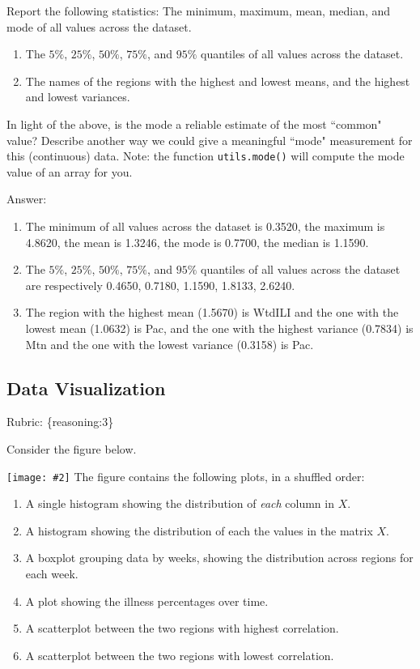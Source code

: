 \documentclass{article}
\def\blu#1{{\color{blu}#1}}
\def\gre#1{{\color{gre}#1}}
\newcommand{\fig}[2]{\texttt{[image: \#2]}}
\def\enum#1{\begin{enumerate}#1\end{enumerate}}
\def\rubric#1{\gre{Rubric: \{#1\}}}{}
\begin{document}
\blu{Report the following statistics}:
The minimum, maximum, mean, median, and mode of all values across the dataset.
\enum{
\item The $5\%$, $25\%$, $50\%$, $75\%$, and $95\%$ quantiles of all values across the dataset.
\item The names of the regions with the highest and lowest means, and the highest and lowest variances.
}
In light of the above, \blu{is the mode a reliable estimate of the most ``common" value? Describe another way we could give a meaningful ``mode" measurement for this (continuous) data.} Note: the function \texttt{utils.mode()} will compute the mode value of an array for you.

\textcolor{gre}{
Answer:
\enum{
\item The minimum of all values across the dataset is 0.3520, the maximum is 4.8620, the mean is 1.3246, the mode is 0.7700, the median is 1.1590.
\item The $5\%$, $25\%$, $50\%$, $75\%$, and $95\%$ quantiles of all values across the dataset are respectively 0.4650, 0.7180, 1.1590, 1.8133, 2.6240.
\item The region with the highest mean (1.5670) is WtdILI and the one with the lowest mean (1.0632) is Pac, and the one with the highest variance (0.7834) is Mtn and the one with the lowest variance (0.3158) is Pac.
}
}

\subsection{Data Visualization}
\rubric{reasoning:3}

Consider the figure below.

\fig{1}{../figs/q12visualize-unlabeled}
The figure contains the following plots, in a shuffled order:
\enum{
\item A single histogram showing the distribution of \emph{each} column in $X$.
\item A histogram showing the distribution of each the values in the matrix $X$.
\item A boxplot grouping data by weeks, showing the distribution across regions for each week.
\item A plot showing the illness percentages over time.
\item A scatterplot between the two regions with highest correlation.
\item A scatterplot between the two regions with lowest correlation.
}
\end{document}
